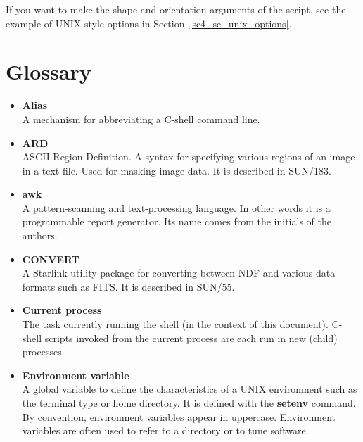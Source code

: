 \documentclass[twoside,11pt]{article}
\newcommand{\htmlref}[2]{#1}
\newcommand{\latex}[1]{#1}
\newcommand{\xref}[3]{#1}
\newcommand{\xlabel}[1]{}
\begin{document}
If you want to make the shape and orientation arguments of the script,
see the example of \htmlref{UNIX-style options}{sc4_se_unix_options}
\latex{in Section~\ref{sc4_se_unix_options}}.

\newpage
\section{\xlabel{sc4_se_glossary}Glossary\label{sc4_sc:glossary}}

\begin{itemize}

\item {\bf\label{sc4_gl_alias}Alias}\\
      A mechanism for abbreviating a C-shell command line.

\item {\bf\label{sc4_gl_ard}ARD}\\
      ASCII Region Definition.  A syntax for specifying various
      regions of an image in a text file.  Used for masking image data.
      It is described in \xref{SUN/183}{sun183}{}.

\item {\bf\label{sc4_gl_awk}awk}\\
      A pattern-scanning and text-processing language.  In other words
      it is a programmable report generator.  Its name comes from the
      initials of the authors.

\item {\bf\label{sc4_gl_convert}CONVERT}\\
      A Starlink utility package for converting between
      \htmlref{NDF}{sc4_gl_ndf} and various data formats such as
      \htmlref{FITS}{sc4_gl_fits}.  It is described in
      \xref{SUN/55}{sun55}{}.

\item {\bf\label{sc4_gl_cur}Current process}\\
      The task currently running the shell (in the context of this
      document).  C-shell scripts invoked from the current process
      are each run in new (child) processes. 

\item {\bf\label{sc4_gl_env}Environment variable}\\
      A global variable to define the characteristics of a UNIX
      environment such as the terminal type or home directory.  It is
      defined with the {\bf setenv} command.  By convention, environment
      variables appear in uppercase.  Environment variables are often
      used to refer to a directory or to tune software.


\end{itemize}
\end{document}
